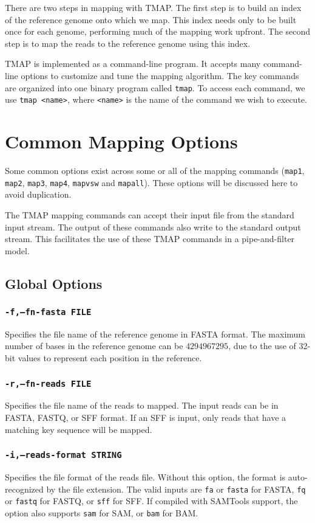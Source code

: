 \documentclass[a4paper,12pt]{book}
\newcommand{\TT}[1]{{\tt #1}} %
\begin{document}
There are two steps in mapping with TMAP.
The first step is to build an index of the reference genome onto which we map.
This index needs only to be built once for each genome, performing much of the mapping work upfront.
The second step is to map the reads to the reference genome using this index.

TMAP is implemented as a command-line program.
It accepts many command-line options to customize and tune the mapping algorithm.
The key commands are organized into one binary program called \TT{tmap}.
To access each command, we use \TT{tmap <name>}, where \TT{<name>} is the name of the command we wish to execute.

\section{Common Mapping Options}
\label{sec:commonoptions}
Some common options exist across some or all of the mapping commands (\TT{map1}, \TT{map2}, \TT{map3}, \TT{map4}, \TT{mapvsw} and \TT{mapall}). 
These options will be discussed here to avoid duplication.

The TMAP mapping commands can accept their input file from the standard input stream.
The output of these commands also write to the standard output stream.
This facilitates the use of these TMAP commands in a pipe-and-filter model.

\subsection{Global Options}
\subsubsection{\TT{-f,--fn-fasta FILE}}
Specifies the file name of the reference genome in FASTA format.
The maximum number of bases in the reference genome can be $4294967295$, due to the use of 32-bit values to represent each position in the reference.

\subsubsection{\TT{-r,--fn-reads FILE}}
Specifies the file name of the reads to mapped.
The input reads can be in FASTA, FASTQ, or SFF format.
If an SFF is input, only reads that have a matching key sequence will be mapped.

\subsubsection{\TT{-i,--reads-format STRING}}
Specifies the file format of the reads file.
Without this option, the format is auto-recognized by the file extension.
The valid inputs are \TT{fa} or \TT{fasta} for FASTA, \TT {fq} or \TT{fastq} for FASTQ, or \TT{sff} for SFF.
If compiled with SAMTools support, the option also supports \TT{sam} for SAM, or \TT{bam} for BAM.
\end{document}

